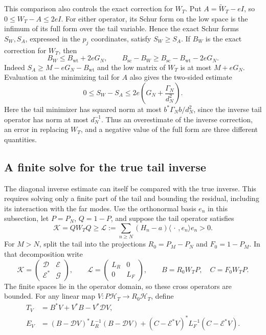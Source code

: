 \documentclass[11pt]{article}
\theoremstyle{definition}
\theoremstyle{remark}
\numberwithin{equation}{section}
\begin{document}
This comparison also controls the exact correction for $W_T$.
Put $A=\widetilde W_T-eI$, so $0\le W_T-A\le2eI$.
For either operator, its Schur form on the low space is the infimum
of its full form over the tail variable.  Hence the exact Schur
forms $S_W,S_A$, expressed in the $p_j$ coordinates, satisfy
$S_W\ge S_A$.  If $B_W$ is the exact correction for $W_T$, then
\begin{equation}
 B_W\le B_{\mathrm{wt}}+2eG_N,
 \qquad B_{\mathrm{sc}}-B_W\ge B_{\mathrm{sc}}-B_{\mathrm{wt}}-2eG_N.
 \label{eq:window-original-correction}
\end{equation}
Indeed $S_A\ge M-eG_N-B_{\mathrm{wt}}$ and the low matrix of $W_T$
is at most $M+eG_N$.  Evaluation at the minimizing tail for $A$
also gives the two-sided estimate
\begin{equation}
 0\le S_W-S_A\le2e\left(G_N+\frac{\Gamma_N}{d_N^2}\right).
 \label{eq:window-schur-perturbation}
\end{equation}
Here the tail minimizer has squared norm at most
$b^*\Gamma_Nb/d_N^2$, since the inverse tail operator has norm
at most $d_N^{-1}$.  Thus an overestimate of the inverse correction,
an error in replacing $W_T$, and a negative value of the full form
are three different quantities.

\subsection{A finite solve for the true tail inverse}

The diagonal inverse estimate can itself be compared with the true
inverse.  This requires solving only a finite part of the tail and
bounding the residual, including its interaction with the far modes.
Use the orthonormal basis $e_n$ in this subsection, let $P=P_N$,
$Q=1-P$, and suppose the tail operator satisfies
\[
 \mathcal K=QW_TQ\ge\mathcal L
    :=\sum_{n\ge N}(H_n-a)\langle\,\cdot\,,e_n\rangle e_n>0.
\]
For $M>N$, split the tail into the projections
$R_0=P_M-P_N$ and $F_0=1-P_M$.  In that decomposition write
\[
 \mathcal K=\begin{pmatrix}\mathcal D&\mathcal E\\
                      \mathcal E^*&\mathcal G\end{pmatrix},
 \qquad
 \mathcal L=\begin{pmatrix}L_R&0\\0&L_F\end{pmatrix},
 \qquad B=R_0W_TP,\quad C=F_0W_TP.
\]
The finite spaces lie in the operator domain, so these cross
operators are bounded.  For any linear map
$V:P\mathcal H_T\to R_0\mathcal H_T$, define
\begin{align}
 T_V&=B^*V+V^*B-V^*\mathcal D V,\nonumber\\
 E_V&=(B-\mathcal D V)^*L_R^{-1}(B-\mathcal D V)
      +(C-\mathcal E^*V)^*L_F^{-1}(C-\mathcal E^*V).
 \label{eq:window-tail-solve}
\end{align}
\end{document}
